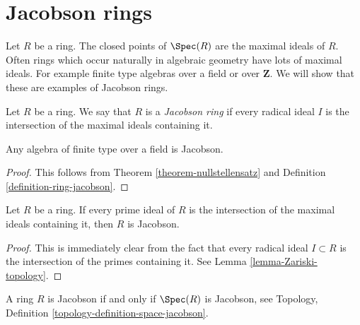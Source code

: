 \section{Jacobson rings}
\label{section-ring-jacobson}

\noindent
Let $R$ be a ring. The closed points of $\Spec(R)$ are the
maximal ideals of $R$. Often rings which occur naturally in algebraic
geometry have lots of maximal ideals. For example finite type algebras
over a field or over $\mathbf{Z}$. We will show that these
are examples of Jacobson rings.

\begin{definition}
\label{definition-ring-jacobson}
Let $R$ be a ring. We say that $R$ is a
{\it Jacobson ring} if every radical
ideal $I$ is the intersection of the
maximal ideals containing it.
\end{definition}

\begin{lemma}
\label{lemma-finite-type-field-Jacobson}
Any algebra of finite type over a field is Jacobson.
\end{lemma}

\begin{proof}
This follows from Theorem \ref{theorem-nullstellensatz}
and Definition \ref{definition-ring-jacobson}.
\end{proof}

\begin{lemma}
\label{lemma-jacobson-prime}
Let $R$ be a ring. If every prime ideal of $R$ is the
intersection of the maximal ideals containing it,
then $R$ is Jacobson.
\end{lemma}

\begin{proof}
This is immediately clear from the fact that
every radical ideal $I \subset R$ is the
intersection of the primes containing it.
See Lemma \ref{lemma-Zariski-topology}.
\end{proof}

\begin{lemma}
\label{lemma-jacobson}
A ring $R$ is Jacobson if and only if $\Spec(R)$
is Jacobson, see Topology,
Definition \ref{topology-definition-space-jacobson}.
\end{lemma}


